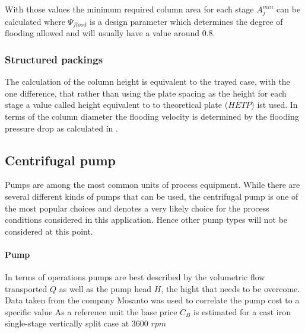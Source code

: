 

        With those values the minimum required column area for each stage $A_j^{min}$ can be calculated
        where $\Psi_{flood}$ is a design parameter which determines the degree of flooding allowed and will usually
        have a value around $0.8$.

    \subsubsection{Structured packings}
        The calculation of the column height is equivalent to the trayed case, with the one difference, that
        rather than using the plate spacing as the height for each stage a value called height equivalent
        to to theoretical plate ($HETP$) ist used. In terms of the column diameter the flooding velocity
        is determined by the flooding pressure drop as calculated in .

\subsection{Centrifugal pump}
		Pumps are among the most common units of process equipment. While there are several different
		kinds of pumps that can be used, the centrifugal pump is one of the most popular choices and
		denotes a very likely choice for the process conditions considered in this application. Hence
		other pump types will not be considered at this point.
		
		\paragraph{Pump}
			In terms of operations pumps are best described by the volumetric flow transported $Q$ as
			well as the pump head $H$, the hight that needs to be overcome. Data taken from the company
			Mosanto was used to correlate the pump cost to a specific value
			As a reference unit the base price $C_B$ is estimated for a cast iron single-stage
			vertically split case at 3600 $rpm$
			
